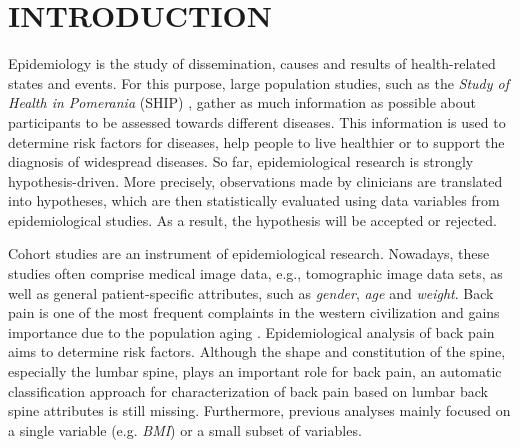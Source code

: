 \documentclass[a4paper,twoside]{style/article}
\begin{document}
\onecolumn \maketitle \normalsize \vfill

\section{\uppercase{Introduction}}
\label{sec:Introduction}
\noindent Epidemiology is the study of dissemination, causes and results of health-related states and events.
For this purpose, large population studies, such as the \emph{Study of Health in Pomerania} (SHIP) \cite{SHIP}, gather as much information as possible about participants to be assessed towards different diseases.
This information is used to determine risk factors for diseases, help people to live healthier or to support the diagnosis of widespread diseases.
So far, epidemiological research is strongly hypothesis-driven.
More precisely, observations made by clinicians are translated into hypotheses, which are then statistically evaluated using data variables from epidemiological studies.
As a result, the hypothesis will be accepted or rejected.

Cohort studies are an instrument of epidemiological research.
Nowadays, these studies often comprise medical image data, e.g., tomographic image data sets, as well as general patient-specific attributes, such as \emph{gender}, \emph{age} and \emph{weight}.
Back pain is one of the most frequent complaints in the western civilization and gains importance due to the population aging \cite{Hoy2010}.
Epidemiological analysis of back pain aims to determine risk factors.
Although the shape and constitution of the spine, especially the lumbar spine, plays an important role for back pain, an automatic classification approach for characterization of back pain based on lumbar back spine attributes is still missing.
Furthermore, previous analyses mainly focused on a single variable (e.g. \emph{BMI}) or a small subset of variables.
\end{document}
